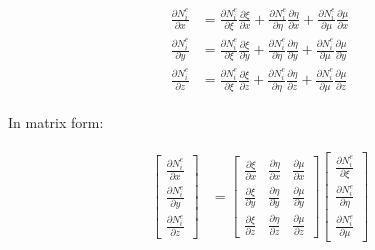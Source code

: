 \documentclass[10pt,b5paper,titlepage]{book}
\newenvironment{eqarray}
{
    \begin{eqnarray}
        \begin{aligned}
}
{
        \end{aligned}
    \end{eqnarray}
}
\begin{document}
\begin{eqarray}
    \frac{\partial N_i^e}{\partial x} &=
        \frac{\partial N_i^e}{\partial \xi} \frac{\partial \xi}{\partial x} +
        \frac{\partial N_i^e}{\partial \eta} \frac{\partial \eta}{\partial x} +
        \frac{\partial N_i^e}{\partial \mu} \frac{\partial \mu}{\partial x}\\
    \frac{\partial N_i^e}{\partial y} &=
        \frac{\partial N_i^e}{\partial \xi} \frac{\partial \xi}{\partial y} +
        \frac{\partial N_i^e}{\partial \eta} \frac{\partial \eta}{\partial y} +
        \frac{\partial N_i^e}{\partial \mu} \frac{\partial \mu}{\partial y}\\
    \frac{\partial N_i^e}{\partial z} &=
        \frac{\partial N_i^e}{\partial \xi} \frac{\partial \xi}{\partial z} +
        \frac{\partial N_i^e}{\partial \eta} \frac{\partial \eta}{\partial z} +
        \frac{\partial N_i^e}{\partial \mu} \frac{\partial \mu}{\partial z}
\end{eqarray}

In matrix form:

\begin{eqarray}
    \begin{bmatrix}
        \frac{\partial N_i^e}{\partial x}\\
        \frac{\partial N_i^e}{\partial y}\\
        \frac{\partial N_i^e}{\partial z}
    \end{bmatrix} &=
    \begin{bmatrix}
        \frac{\partial \xi}{\partial x} &
        \frac{\partial \eta}{\partial x} &
        \frac{\partial \mu}{\partial x}\\
        \frac{\partial \xi}{\partial y} &
        \frac{\partial \eta}{\partial y} &
        \frac{\partial \mu}{\partial y}\\
        \frac{\partial \xi}{\partial z} &
        \frac{\partial \eta}{\partial z} &
        \frac{\partial \mu}{\partial z}
    \end{bmatrix}
    \begin{bmatrix}
        \frac{\partial N_i^e}{\partial \xi}\\
        \frac{\partial N_i^e}{\partial \eta}\\
        \frac{\partial N_i^e}{\partial \mu}
    \end{bmatrix}
\end{eqarray}
\end{document}
